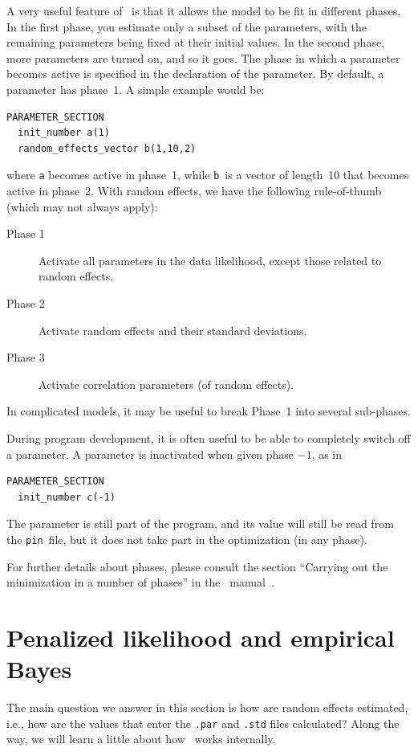 \documentclass{admbmanual}
\begin{document}
A very useful feature of \scAB\ is that it allows the model to be fit in
different phases. In the first phase, you estimate only a subset of the
parameters, with the remaining parameters being fixed at their initial values.
In the second phase, more parameters are turned on, and so it goes. The phase in
which a parameter becomes active is specified in the declaration of the
parameter. By default, a parameter has phase~1. A simple example would be:
\begin{lstlisting}
PARAMETER_SECTION
  init_number a(1)
  random_effects_vector b(1,10,2)
\end{lstlisting}
where \texttt{a} becomes active in phase~1, while \texttt{b}\ is a vector of
length~10 that becomes active in phase~2. With random effects, we have the
following rule-of-thumb (which may not always apply):
\begin{description}
  \item[Phase 1] Activate all parameters in the data likelihood, except those
  related to random effects.
  \item[Phase 2] Activate random effects and their standard deviations.
  \item[Phase 3] Activate correlation parameters (of random effects).
\end{description}
In complicated models, it may be useful to break Phase~1 into several
sub-phases.

During program development, it is often useful to be able to completely switch
off a parameter. A parameter is inactivated when given phase $-1$, as in
\begin{lstlisting}
PARAMETER_SECTION
  init_number c(-1)
\end{lstlisting}
The parameter is still part of the program, and its value will still be read
from the \texttt{pin}~file, but it does not take part in the optimization (in
any phase).

For further details about phases, please consult the section ``Carrying out the
minimization in a number of phases'' in the \scAB\ manual~\cite{admb_manual}.

\section{Penalized likelihood and empirical Bayes}
\label{sec:hood}

The main question we answer in this section is how are random effects estimated,
i.e., how are the values that enter the \texttt{.par} and \texttt{.std} files
calculated? Along the way, we will learn a little about how \scAR\ works
internally.
\end{document}
